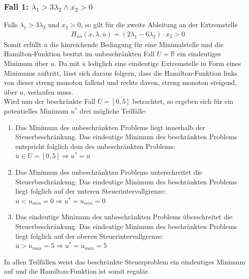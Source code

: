 \subsubsection*{Fall 1: \boldmath$\lambda_1 > 3\lambda_2 \land x_2 > 0$}
Falls $\lambda_1 > 3\lambda_2$ und $x_2 > 0$, so gilt für die zweite Ableitung an der Extremstelle
\begin{align}
	&H_{uu}(x, \lambda, \overline{u})  = (2 \lambda_1 -  6 \lambda_2) \cdot  x_2 > 0.
\end{align}
Somit erfüllt $\overline{u}$ die hinreichende Bedingung für eine Minimalstelle und die Hamilton-Funktion besitzt im unbeschränkten Fall $U = \mathbb{R}$ ein eindeutiges Minimum über $u$. Da mit $\overline{u}$ lediglich eine eindeutige Extremstelle in Form eines Minimums auftritt, lässt sich daraus folgern, dass die Hamilton-Funktion links von dieser streng monoton fallend und rechts davon, streng monoton steigend, über $u$, verlaufen muss. \\ 
Wird nun der beschränkte Fall $U = [0,5]$ betrachtet, so ergeben sich für ein potentielles Minimum $u^*$ drei mögliche Teilfälle: 
\begin{enumerate}[label=(\alph*)]
	\item Das Minimum des unbeschränkten Problems liegt innerhalb der Steuerbeschränkung. Das eindeutige Minimum des beschränkten Problems entspricht folglich dem des unbeschränkten Problems: \\
$\overline{u} \in U = [0,5] \Rightarrow u^* = \overline{u}$
	\item Das Minimum des unbeschränkten Problems unterschreitet die Steuerbeschränkung. Das eindeutige Minimum des beschränkten Problems liegt folglich auf der unteren Steuerintervallgrenze:\\
$\overline{u} < u_{min} = 0 \Rightarrow u^* = u_{min} = 0$
	\item Das eindeutige Minimum des unbeschränkten Problems überschreitet die Steuerbeschränkung. Das eindeutige Minimum des beschränkten Problems liegt folglich auf der oberen Steuerintervallgrenze: \\ 
$\overline{u} > u_{max} = 5 \Rightarrow u^* = u_{max} = 5$
\end{enumerate}
In allen Teilfällen weist das beschränkte Steuerproblem ein eindeutiges Minimum auf und die Hamilton-Funktion ist somit regulär.

